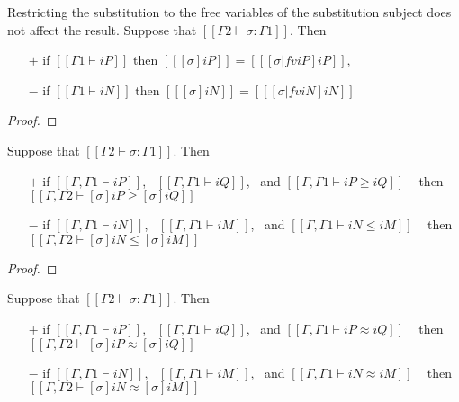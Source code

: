 \begin{lemma}
  \label{lemma:subst-restr-fv}
  Restricting the substitution to the free variables of the
  substitution subject does not affect the result.
  Suppose that $[[Γ2 ⊢ σ : Γ1]]$. Then
  \begin{itemize}
  \item[$+$] if $[[Γ1 ⊢ iP]]$ then $[[ [σ]iP ]] = [[ [σ|fv iP]iP ]]$,
  \item[$-$] if $[[Γ1 ⊢ iN]]$ then $[[ [σ]iN ]] = [[ [σ|fv iN]iN ]]$
  \end{itemize}
\end{lemma}
\begin{proof}
\end{proof}

\begin{lemma}
  \label{lemma:subst-pres-subt}

  Suppose that $[[Γ2 ⊢ σ : Γ1]]$. Then
  \begin{itemize}
  \item[$+$] if $[[Γ, Γ1 ⊢ iP]]$,~ $[[Γ, Γ1 ⊢ iQ]]$,~ and $[[Γ, Γ1 ⊢ iP ≥ iQ]]$ ~ then $[[Γ, Γ2 ⊢ [σ]iP ≥ [σ]iQ]]$
  \item[$-$] if $[[Γ, Γ1 ⊢ iN]]$,~ $[[Γ, Γ1 ⊢ iM]]$,~ and $[[Γ, Γ1 ⊢ iN ≤ iM]]$ ~ then $[[Γ, Γ2 ⊢ [σ]iN ≤ [σ]iM]]$
  \end{itemize}
\end{lemma}
\begin{proof}
\end{proof}

\begin{corollary}
  \label{corollary:subst-pres-equiv}

  Suppose that $[[Γ2 ⊢ σ : Γ1]]$. Then
  \begin{itemize}
  \item[$+$] if $[[Γ, Γ1 ⊢ iP]]$,~ $[[Γ, Γ1 ⊢ iQ]]$,~ and $[[Γ, Γ1 ⊢ iP ≈ iQ]]$ ~ then $[[Γ, Γ2 ⊢ [σ]iP ≈ [σ]iQ]]$
  \item[$-$] if $[[Γ, Γ1 ⊢ iN]]$,~ $[[Γ, Γ1 ⊢ iM]]$,~ and $[[Γ, Γ1 ⊢ iN ≈ iM]]$ ~ then $[[Γ, Γ2 ⊢ [σ]iN ≈ [σ]iM]]$
  \end{itemize}
\end{corollary}